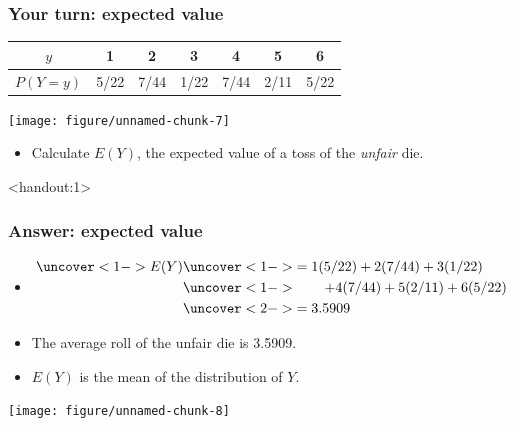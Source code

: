 \documentclass[handout]{beamer}\usepackage{graphicx, color}
\newenvironment{knitrout}{}{} %
\newcommand{\answers}{1}
\numberwithin{equation}{section}
\begin{document}
\begin{frame}
\frametitle{Your turn: expected value}

\begin{tabular}{ccccccc}
$y$ & 1 & 2 & 3 & 4 & 5 & 6 \\ \hline
$P(Y = y)$ & 5/22 & 7/44 & 1/22 & 7/44 & 2/11 & 5/22
\end{tabular} 

\begin{center}
\begin{knitrout}
\color{fgcolor}
\texttt{[image: figure/unnamed-chunk-7]} 

\end{knitrout}

\end{center}

\begin{itemize}
\item Calculate $E(Y)$, the expected value of a toss of the \emph{unfair} die.
\end{itemize}
\end{frame}




\begin{frame}<handout:\answers>
\frametitle{Answer: expected value}\scriptsize
\begin{itemize}
\item 
\begin{align*}
\uncover<1->{E(Y)} & \uncover<1->{= 1 (5/22) + 2(7/44) + 3 (1/22)} \\
&\uncover<1->{ \qquad + 4(7/44) + 5(2/11) + 6(5/22)} \\
&\uncover<2->{ = 3.5909}
\end{align*}
\pause \pause \item The average roll of the unfair die is 3.5909.
\pause \item $E(Y)$ is the  mean of the distribution of $Y$.
\end{itemize}

\begin{center}
\begin{knitrout}
\color{fgcolor}
\texttt{[image: figure/unnamed-chunk-8]} 

\end{knitrout}

\end{center}
\end{frame}
\end{document}
